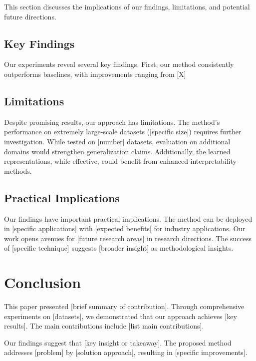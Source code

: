 \documentclass[12pt,a4paper]{article}
\theoremstyle{definition}
\theoremstyle{remark}
\begin{document}
This section discusses the implications of our findings, limitations, and potential future directions.

\subsection{Key Findings}
\label{subsec:findings}

Our experiments reveal several key findings. First, our method consistently outperforms baselines, with improvements ranging from [X]%

\subsection{Limitations}
\label{subsec:limitations}

Despite promising results, our approach has limitations. The method's performance on extremely large-scale datasets ([specific size]) requires further investigation. While tested on [number] datasets, evaluation on additional domains would strengthen generalization claims. Additionally, the learned representations, while effective, could benefit from enhanced interpretability methods.

\subsection{Practical Implications}
\label{subsec:implications}

Our findings have important practical implications. The method can be deployed in [specific applications] with [expected benefits] for industry applications. Our work opens avenues for [future research areas] in research directions. The success of [specific technique] suggests [broader insight] as methodological insights.

\section{Conclusion}
\label{sec:conclusion}

This paper presented [brief summary of contribution]. Through comprehensive experiments on [datasets], we demonstrated that our approach achieves [key results]. The main contributions include [list main contributions].

Our findings suggest that [key insight or takeaway]. The proposed method addresses [problem] by [solution approach], resulting in [specific improvements].
\end{document}
